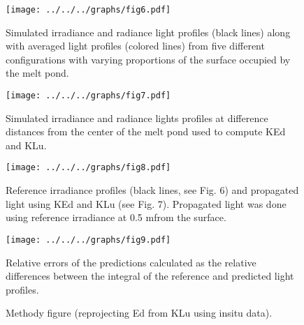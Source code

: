 \documentclass[12pt,a4paper]{scrartcl}
\begin{document}
\clearpage
\newpage

\begin{figure}[ht]
	\centering
	\texttt{[image: ../../../graphs/fig6.pdf]}
	\caption{Simulated irradiance and radiance light profiles (black lines) along with averaged light profiles (colored lines) from five different configurations with varying proportions of the surface occupied by the melt pond.}
\end{figure}

\clearpage
\newpage

\begin{figure}[ht]
	\centering
	\texttt{[image: ../../../graphs/fig7.pdf]}
	\caption{Simulated irradiance and radiance lights profiles at difference distances from the center of the melt pond used to compute KEd and KLu.}
\end{figure}

\clearpage
\newpage

\begin{figure}[ht]
	\centering
	\texttt{[image: ../../../graphs/fig8.pdf]}
	\caption{Reference irradiance profiles (black lines, see Fig. 6) and propagated light using KEd and KLu (see Fig. 7). Propagated light was done using reference irradiance at 0.5 mfrom the surface.}
\end{figure}

\clearpage
\newpage

\begin{figure}[ht]
	\centering
	\texttt{[image: ../../../graphs/fig9.pdf]}
	\caption{Relative errors of the predictions calculated as the relative differences between the integral of the reference and predicted light profiles.}
\end{figure}

\clearpage
\newpage

\begin{figure}[ht]
	\centering
	\caption{Methody figure (reprojecting Ed from KLu using insitu data).}
\end{figure}
\end{document}
